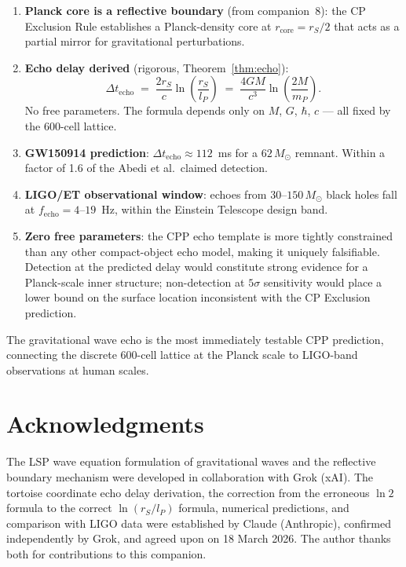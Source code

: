 \documentclass[12pt]{article}
\newcommand{\lP}{l_P}
\newcommand{\mP}{m_P}
\newcommand{\rS}{r_S}
\newcommand{\rcore}{r_{\mathrm{core}}}
\newcommand{\Dt}{\Delta t_{\mathrm{echo}}}
\begin{document}
\begin{enumerate}
  \item \textbf{Planck core is a reflective boundary} (from companion~8):
    the CP Exclusion Rule establishes a Planck-density core at
    $\rcore = \rS/2$ that acts as a partial mirror for gravitational
    perturbations.

  \item \textbf{Echo delay derived} (rigorous, Theorem~\ref{thm:echo}):
    \begin{equation*}
      \Dt \;=\; \frac{2\rS}{c}\ln\!\left(\frac{\rS}{\lP}\right)
      \;=\; \frac{4GM}{c^3}\ln\!\left(\frac{2M}{\mP}\right).
    \end{equation*}
    No free parameters.  The formula depends only on $M$, $G$, $\hbar$,
    $c$ — all fixed by the 600-cell lattice.

  \item \textbf{GW150914 prediction}: $\Dt \approx 112$~ms for a
    $62\,M_\odot$ remnant.  Within a factor of 1.6 of the Abedi et al.\
    claimed detection.

  \item \textbf{LIGO/ET observational window}: echoes from
    $30$--$150\,M_\odot$ black holes fall at $f_{\mathrm{echo}} =
    4$--$19$~Hz, within the Einstein Telescope design band.

  \item \textbf{Zero free parameters}: the CPP echo template is more
    tightly constrained than any other compact-object echo model, making
    it uniquely falsifiable.  Detection at the predicted delay would
    constitute strong evidence for a Planck-scale inner structure;
    non-detection at $5\sigma$ sensitivity would place a lower bound on
    the surface location inconsistent with the CP Exclusion prediction.
\end{enumerate}

The gravitational wave echo is the most immediately testable CPP prediction,
connecting the discrete 600-cell lattice at the Planck scale to LIGO-band
observations at human scales.

\section*{Acknowledgments}

The LSP wave equation formulation of gravitational waves and the
reflective boundary mechanism were developed in collaboration with
Grok (xAI).  The tortoise coordinate echo delay derivation, the
correction from the erroneous $\ln 2$ formula to the correct
$\ln(r_S/l_P)$ formula, numerical predictions, and comparison with
LIGO data were established by Claude (Anthropic), confirmed independently
by Grok, and agreed upon on 18 March 2026.  The author thanks both
for contributions to this companion.
\end{document}
